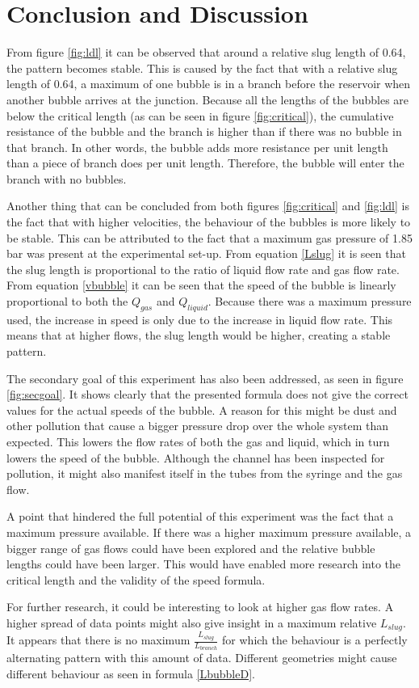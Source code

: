 \section{Conclusion and Discussion}
\label{conclusion}
From figure \ref{fig:ldl} it can be observed that around a relative slug length of 0.64, the pattern becomes stable. This is caused by the fact that with a relative slug length of 0.64, a maximum of one bubble is in a branch before the reservoir when another bubble arrives at the junction. Because all the lengths of the bubbles are below the critical length (as can be seen in figure \ref{fig:critical}), the cumulative resistance of the bubble and the branch is higher than if there was no bubble in that branch. In other words, the bubble adds more resistance per unit length than a piece of branch does per unit length. Therefore, the bubble will enter the branch with no bubbles. 
\par
Another thing that can be concluded from both figures \ref{fig:critical} and \ref{fig:ldl} is the fact that with higher velocities, the behaviour of the bubbles is more likely to be stable. This can be attributed to the fact that a maximum gas pressure of 1.85 bar was present at the experimental set-up. From equation \ref{Lslug} it is seen that the slug length is proportional to the ratio of liquid flow rate and gas flow rate. From equation \ref{vbubble} it can be seen that the speed of the bubble is linearly proportional to both the $Q_{gas}$ and $Q_{liquid}$. Because there was a maximum pressure used, the increase in speed is only due to the increase in liquid flow rate. This means that at higher flows, the slug length would be higher, creating a stable pattern. 
\par
The secondary goal of this experiment has also been addressed, as seen in figure \ref{fig:secgoal}. It shows clearly that the presented formula does not give the correct values for the actual speeds of the bubble. A reason for this might be dust and other pollution that cause a bigger pressure drop over the whole system than expected. This lowers the flow rates of both the gas and liquid, which in turn lowers the speed of the bubble. Although the channel has been inspected for pollution, it might also manifest itself in the tubes from the syringe and the gas flow. 
\par
A point that hindered the full potential of this experiment was the fact that a maximum pressure available. If there was a higher maximum pressure available, a bigger range of gas flows could have been explored and the relative bubble lengths could have been larger. This would have enabled more research into the critical length and the validity of the speed formula.
\par
For further research, it could be interesting to look at higher gas flow rates. A higher spread of data points might also give insight in a maximum relative $L_{slug}$. It appears that there is no maximum $\frac{L_{slug}}{L_{branch}}$ for which the behaviour is a perfectly alternating pattern with this amount of data. Different geometries might cause different behaviour as seen in formula \ref{LbubbleD}.